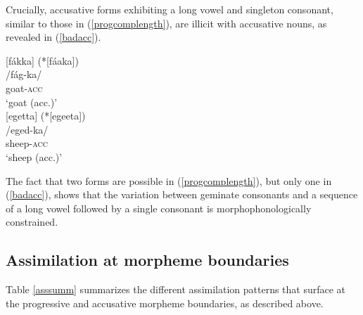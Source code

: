 \documentclass[output=paper]{langscibook}
\begin{document}
Crucially, accusative forms exhibiting a long vowel and singleton consonant, similar to those in (\ref{progcomplength}), are illicit with accusative nouns, as revealed in (\ref{badacc}).

\ea \label{badacc}
\begin{multicols}{2}
\begin{xlist}
\ex {}[fákka] (*{}[fáaka])\\
/fág-ka/\\
goat-\textsc{acc}\\
`goat (acc.)'\\
\ex {}[egetta] (*{}[egeeta])\\
/eged-ka/\\
sheep-\textsc{acc}\\
`sheep (acc.)'\\
\end{xlist}
\end{multicols}
\z

The fact that two forms are possible in (\ref{progcomplength}), but only one in (\ref{badacc}), shows that the variation between geminate consonants and a sequence of a long vowel followed by a single consonant is morphophonologically constrained.

\subsection{Assimilation at morpheme boundaries}
Table \ref{asssumm} summarizes the different assimilation patterns that surface at the progressive and accusative morpheme boundaries, as described above.
\end{document}
